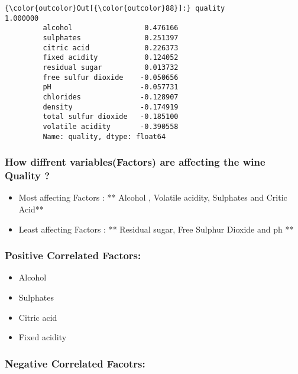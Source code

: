\documentclass[11pt]{article}
\providecommand{\tightlist}{%
      \setlength{\itemsep}{0pt}\setlength{\parskip}{0pt}}
\begin{document}
\begin{Verbatim}[commandchars=\\\{\}]
{\color{outcolor}Out[{\color{outcolor}88}]:} quality                 1.000000
         alcohol                 0.476166
         sulphates               0.251397
         citric acid             0.226373
         fixed acidity           0.124052
         residual sugar          0.013732
         free sulfur dioxide    -0.050656
         pH                     -0.057731
         chlorides              -0.128907
         density                -0.174919
         total sulfur dioxide   -0.185100
         volatile acidity       -0.390558
         Name: quality, dtype: float64
\end{Verbatim}
            
    \subsubsection{How diffrent variables(Factors) are affecting the wine
Quality
?}\label{how-diffrent-variablesfactors-are-affecting-the-wine-quality}

\begin{itemize}
\tightlist
\item
  Most affecting Factors : ** Alcohol , Volatile acidity, Sulphates and
  Critic Acid**
\item
  Least affecting Factors : ** Residual sugar, Free Sulphur Dioxide and
  ph **
\end{itemize}

    \subsubsection{Positive Correlated
Factors:}\label{positive-correlated-factors}

\begin{itemize}
\tightlist
\item
  Alcohol\\
\item
  Sulphates\\
\item
  Citric acid\\
\item
  Fixed acidity
\end{itemize}

\subsubsection{Negative Correlated
Facotrs:}\label{negative-correlated-facotrs}
\end{document}
